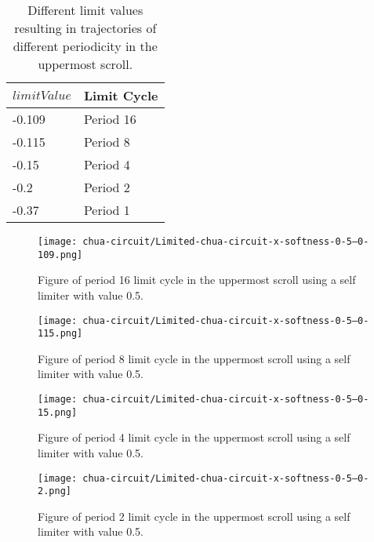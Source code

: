 \documentclass[main]{subfiles}
\begin{document}
\begin{table}[H]
\renewcommand{\arraystretch}{1.2}
\center
\begin{tabular}{@{}ll@{}}
	\toprule
   \(limitValue\) & Limit Cycle\\
   \midrule
   -0.109 & Period 16 \\
   -0.115 & Period 8 \\ 
   -0.15 & Period 4 \\
   -0.2  & Period 2 \\
   -0.37 & Period 1 \\
   \bottomrule
\end{tabular}
\caption[Limiter values for periodic trajectories for for an x self-limiting limiter with softness 0.13]{Different limit values resulting in trajectories of different periodicity in the uppermost scroll.}
\label{table:x-0.5-upperscroll-periodicities}
\end{table}

\begin{figure}[H]
\centering
\texttt{[image: chua-circuit/Limited-chua-circuit-x-softness-0-5--0-109.png]}
\caption[Figure of period 16 limit cycle]{Figure of period 16 limit cycle in the uppermost scroll using a self limiter with value 0.5.}
\label{figure:x-0.5-16-limit-cycle-upperscroll-trajectory}
\end{figure}

\begin{figure}[H]
\centering
\texttt{[image: chua-circuit/Limited-chua-circuit-x-softness-0-5--0-115.png]}
\caption[Figure of period 8 limit cycle]{Figure of period 8 limit cycle in the uppermost scroll using a self limiter with value 0.5.}
\label{figure:x-0.5-8-limit-cycle-upperscroll-trajectory}
\end{figure}

\begin{figure}[H]
\centering
\texttt{[image: chua-circuit/Limited-chua-circuit-x-softness-0-5--0-15.png]}
\caption[Figure of period 4 limit cycle]{Figure of period 4 limit cycle in the uppermost scroll using a self limiter with value 0.5.}
\label{figure:x-0.5-4-limit-cycle-upperscroll-trajectory}
\end{figure}

\begin{figure}[H]
\centering
\texttt{[image: chua-circuit/Limited-chua-circuit-x-softness-0-5--0-2.png]}
\caption[Figure of period 2 limit cycle]{Figure of period 2 limit cycle in the uppermost scroll using a self limiter with value 0.5.}
\label{figure:x-0.5-2-limit-cycle-upperscroll-trajectory}
\end{figure}
\end{document}
